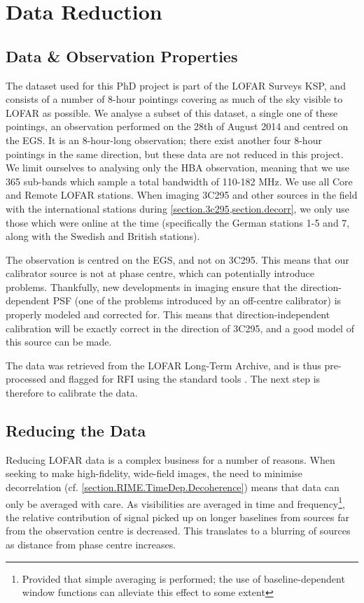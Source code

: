 \section{Data Reduction}


\subsection{Data \& Observation Properties}
\pg
The dataset used for this PhD project is part of the LOFAR Surveys KSP, and consists of a number of 8-hour pointings covering as much of the sky visible to LOFAR as possible. We analyse a subset of this dataset, a single one of these pointings, an observation performed on the 28th of August 2014 and centred on the EGS. It is an 8-hour-long observation; there exist another four 8-hour pointings in the same direction, but these data are not reduced in this project. We limit ourselves to analysing only the HBA observation, meaning that we use 365 sub-bands which sample a total bandwidth of 110-182 MHz. We use all Core and Remote LOFAR stations. When imaging 3C295 and other sources in the field with the international stations during \cref{section.3c295,section.decorr}, we only use those which were online at the time (specifically the German stations 1-5 and 7, along with the Swedish and British stations).

\pg
The observation is centred on the EGS, and not on 3C295. This means that our calibrator source is not at phase centre, which can potentially introduce problems. Thankfully, new developments in imaging  ensure that the direction-dependent PSF (one of the problems introduced by an off-centre calibrator) is properly modeled and corrected for. This means that direction-independent calibration will be exactly correct in the direction of 3C295, and a good model of this source can be made.

\pg
The data was retrieved from the LOFAR Long-Term Archive, and is thus pre-processed and flagged for RFI using the standard tools . The next step is therefore to calibrate the data.

\subsection{Reducing the Data}

\pg
Reducing LOFAR data is a complex business for a number of reasons. When seeking to make high-fidelity, wide-field images, the need to minimise decorrelation (cf. \cref{section.RIME.TimeDep.Decoherence}) means that data can only be averaged with care. As visibilities are averaged in time and frequency\footnote{Provided that simple averaging is performed; the use of baseline-dependent window functions can alleviate this effect to some extent}, the relative contribution of signal picked up on longer baselines from sources far from the observation centre is decreased. This translates to a blurring of sources as distance from phase centre increases.

